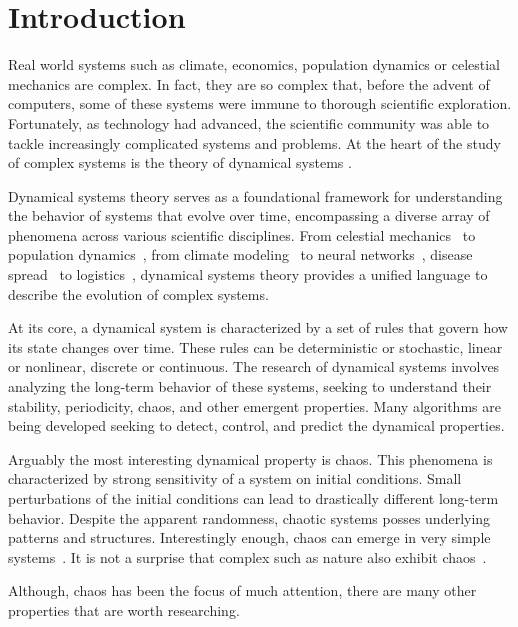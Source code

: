 \chapter{Introduction}
\label{sec:Introduction}

Real world systems such as climate, economics, population dynamics or celestial mechanics are complex.
In fact, they are so complex that, before the advent of computers, some of these systems were immune to thorough scientific exploration.
Fortunately, as technology had advanced, the scientific community was able to tackle increasingly complicated systems and problems.
At the heart of the study of complex systems is the theory of dynamical systems \cite{Devaney20211026, Hirsch2013, Strogatz201854}.
\par
Dynamical systems theory serves as a foundational framework for understanding the behavior of systems that evolve over time, encompassing a diverse array of phenomena across various scientific disciplines.
From celestial mechanics~\cite{Holmes1990} to population dynamics~\cite{Hastings1993,Hadeler2001}, from climate modeling~\cite{Ghil2023} to neural networks~\cite{Cessac2009, Vogt2020, Li2019}, disease spread~\cite{Ritelli20210930} to logistics~\cite{Kumara2003}, dynamical systems theory provides a unified language to describe the evolution of complex systems.
\par
At its core, a dynamical system is characterized by a set of rules that govern how its state changes over time.
These rules can be deterministic or stochastic, linear or nonlinear, discrete or continuous.
The research of dynamical systems involves analyzing the long-term behavior of these systems, seeking to understand their stability, periodicity, chaos, and other emergent properties.
Many algorithms are being developed seeking to detect, control, and predict the dynamical properties.
\par
Arguably the most interesting dynamical property is chaos.
This phenomena is characterized by strong sensitivity of a system on initial conditions.
Small perturbations of the initial conditions can lead to drastically different long-term behavior.
Despite the apparent randomness, chaotic systems posses underlying patterns and structures.
Interestingly enough, chaos can emerge in very simple systems~\cite{Lorenz2004,May19760610}.
It is not a surprise that complex such as nature also exhibit chaos~\cite{Toker2020}.
\par
Although, chaos has been the focus of much attention, there are many other properties that are worth researching.
